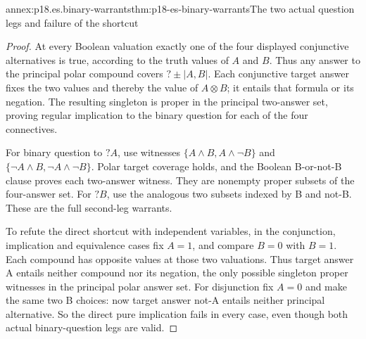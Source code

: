 \begin{annexitem}{annex:p18.es.binary-warrants}{thm:p18-es-binary-warrants}{The two actual question legs and failure of the shortcut}
\begin{proof}
At every Boolean valuation exactly one of the four displayed conjunctive
alternatives is true, according to the truth values of \(A\) and \(B\).
Thus any answer to the principal polar compound covers \(?\pm|A,B|\).
Each conjunctive target answer fixes the two values and thereby the value
of \(A\otimes B\); it entails that formula or its negation. The resulting
singleton is proper in the principal two-answer set, proving regular
implication to the binary question for each of the four connectives.

For binary question to \(?A\), use witnesses
\(\{A\land B,A\land\neg B\}\) and
\(\{\neg A\land B,\neg A\land\neg B\}\).
Polar target coverage holds, and the Boolean B-or-not-B clause proves each
two-answer witness. They are nonempty proper subsets of the four-answer set.
For \(?B\), use the analogous two subsets indexed by B and not-B.
These are the full second-leg warrants.

To refute the direct shortcut with independent variables, in the conjunction,
implication and equivalence cases fix \(A=1\), and compare \(B=0\) with
\(B=1\). Each compound has opposite values at those two valuations.
Thus target answer A entails neither compound nor its negation, the only
possible singleton proper witnesses in the principal polar answer set.
For disjunction fix \(A=0\) and make the same two B choices: now target
answer not-A entails neither principal alternative. So the direct pure
implication fails in every case, even though both actual binary-question
legs are valid.
\end{proof}
\end{annexitem}

